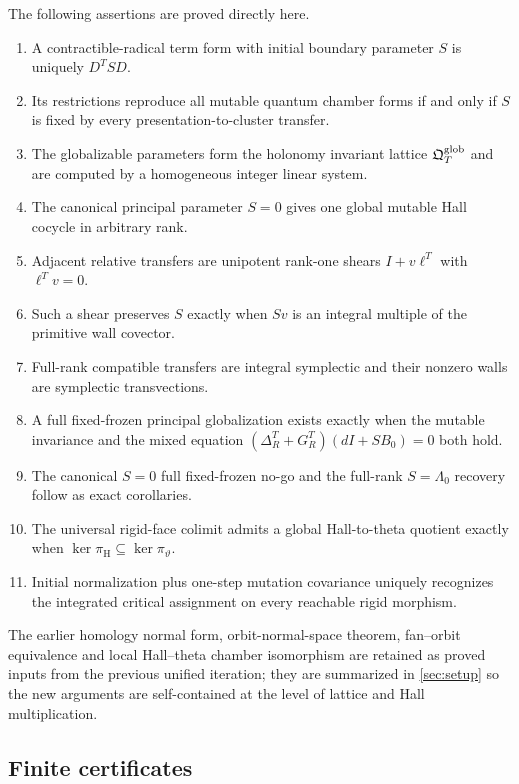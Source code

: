 The following assertions are proved directly here.
\begin{enumerate}[label=(\Alph*),leftmargin=2.5em]
\item A contractible-radical term form with initial boundary parameter $S$ is
      uniquely $D^TSD$.
\item Its restrictions reproduce all mutable quantum chamber forms if and
      only if $S$ is fixed by every presentation-to-cluster transfer.
\item The globalizable parameters form the holonomy invariant lattice
      $\mathfrak Q^{\mathrm{glob}}_T$ and are computed by a homogeneous integer linear system.
\item The canonical principal parameter $S=0$ gives one global mutable Hall
      cocycle in arbitrary rank.
\item Adjacent relative transfers are unipotent rank-one shears
      $I+v\ell^T$ with $\ell^Tv=0$.
\item Such a shear preserves $S$ exactly when $Sv$ is an integral multiple of
      the primitive wall covector.
\item Full-rank compatible transfers are integral symplectic and their
      nonzero walls are symplectic transvections.
\item A full fixed-frozen principal globalization exists exactly when the
      mutable invariance and the mixed equation
      $(\Delta_R^T+G_R^T)(dI+SB_0)=0$ both hold.
\item The canonical $S=0$ full fixed-frozen no-go and the full-rank
      $S=\Lambda_0$ recovery follow as exact corollaries.
\item The universal rigid-face colimit admits a global Hall-to-theta quotient
      exactly when $\ker\pi_{\mathrm H}\subseteq\ker\pi_\vartheta$.
\item Initial normalization plus one-step mutation covariance uniquely
      recognizes the integrated critical assignment on every reachable rigid
      morphism.
\end{enumerate}

The earlier homology normal form, orbit-normal-space theorem, fan--orbit
equivalence and local Hall--theta chamber isomorphism are retained as proved
inputs from the previous unified iteration; they are summarized in
\cref{sec:setup} so the new arguments are self-contained at the level of
lattice and Hall multiplication.

\subsection{Finite certificates}

